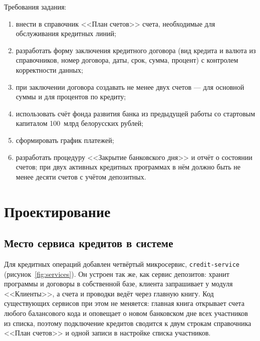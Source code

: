 \documentclass[14pt,a4paper]{extarticle}
\begin{document}
Требования задания:
\begin{enumerate}
\item внести в справочник <<План счетов>> счета, необходимые для обслуживания кредитных
линий;
\item разработать форму заключения кредитного договора (вид кредита и валюта из
справочников, номер договора, даты, срок, сумма, процент) с контролем корректности данных;
\item при заключении договора создавать не менее двух счетов --- для основной суммы и
для процентов по кредиту;
\item использовать счёт фонда развития банка из предыдущей работы со стартовым
капиталом 100~млрд белорусских рублей;
\item сформировать график платежей;
\item разработать процедуру <<Закрытие банковского дня>> и отчёт о состоянии счетов; при
двух активных кредитных программах в нём должно быть не менее десяти счетов с учётом
депозитных.
\end{enumerate}

\section{Проектирование}

\subsection{Место сервиса кредитов в системе}

Для кредитных операций добавлен четвёртый микросервис, \texttt{credit-service}
(рисунок~\ref{fig:services}). Он устроен так же, как сервис депозитов: хранит программы и
договоры в собственной базе, клиента запрашивает у модуля <<Клиенты>>, а счета и проводки
ведёт через главную книгу. Код существующих сервисов при этом не меняется: главная книга
открывает счета любого балансового кода и оповещает о новом банковском дне всех участников
из списка, поэтому подключение кредитов сводится к двум строкам справочника <<План счетов>>
и одной записи в настройке списка участников.
\end{document}
